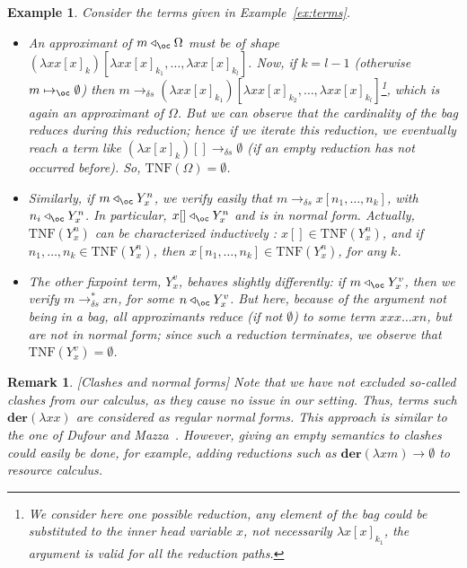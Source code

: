 \documentclass[10pt,a4paper]{article}
\newtheorem{example}[theorem]{Example}
\newtheorem{remark}[theorem]{Remark}
\newcommand{\<}{\langle}
\renewcommand{\>}{\rangle}
\newcommand{\der}[1]{\ensuremath{\mathbf{der}(#1)}}
\newcommand{\todb}{\mapsto_{\oc}} %
\newcommand{\todbrs}{\to_{\delta s}} %
\newcommand{\app}{\triangleleft_\oc} %
\newcommand{\taylornf}[1]{\ensuremath{\text{TNF}(#1)}}
\newcommand{\nativeemdash}{\ifmmode\text{\textemdash}\else\textemdash\fi}
\begin{document}
\begin{example}\label{ex:terms_app} Consider the terms given in Example~\ref{ex:terms}.
	\begin{itemize}
		\item An approximant of $m\app\Omega$ must be of shape $(\lambda x
			x[x]_k)[\lambda x x[x]_{k_1},\dots ,\lambda x x[x]_{k_l}]$.
			Now, if $k=l-1$ (otherwise $m\todb \emptyset$) then $m\todbrs (\lambda x
			x[x]_{k_1})[\lambda x x[x]_{k_2},\dots ,\lambda x
			x[x]_{k_l}]$\footnote{
				We consider here one possible reduction, any
				element of the bag could be substituted to the
				inner head variable $x$, not necessarily $\lambda
				x[x]_{k_1}$, the argument is valid for all the
				reduction paths.
			}, which is again an approximant of $\Omega$. But we can
			observe that the cardinality of the bag reduces during
			this reduction; hence if we iterate this reduction, we
			eventually reach a term like $(\lambda
			x[x]_k)[]\todbrs\emptyset$ (if an empty reduction has
			not occurred before). So, $\taylornf\Omega=\emptyset$.
		\item Similarly, if $m\app Y^n_x$, we verify easily that
			$m\todbrs x[n_1,\dots ,n_k]$, with $n_i\app Y^n_x$. In
			particular, $x[]\app Y^n_x$ and is in normal form.
			Actually, $\taylornf{Y^n_x}$ can be characterized
			inductively : $x[]\in\taylornf{Y^n_x}$, and if
			$n_1,\dots ,n_k\in \taylornf{Y^n_x}$, then
			$x[n_1,\dots ,n_k]\in\taylornf{Y^n_x}$, for any $k$.
		\item The other fixpoint term, $Y^v_x$, behaves slightly
			differently: if $m\app Y^v_x$, then we verify
			$m\todbrs^* xn$, for some $n\app Y^v_x$. But here,
			because of the argument not being in a bag, all
			approximants reduce (if not $\emptyset$) to some term
			$xxx\dots  xn$, but are not in normal form; since such a
			reduction terminates, we observe that
			$\taylornf{Y^v_x}=\emptyset$.
	\end{itemize}

\end{example}
\begin{remark}\label{rem:clashes}[Clashes and normal forms]
	Note that we have not excluded so-called \emph{clashes} from our calculus,
	as they cause no issue in our setting. Thus, terms such $\der{\lambda xx}$ are considered as
	regular normal forms. This approach is similar to the one of Dufour and
	Mazza~\cite{mazza-dufour}. However, giving an empty semantics to clashes could
	easily be done, for example, adding reductions such as $\der{\lambda
	xm}\to\emptyset$ to resource calculus.
\end{remark}
\end{document}

